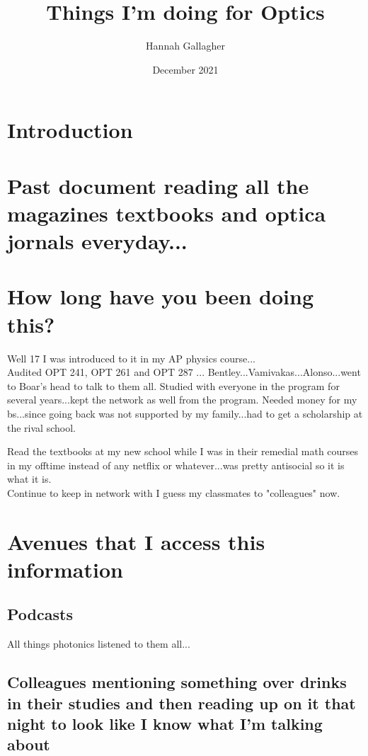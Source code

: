 \documentclass{article}
\title{Things I'm doing for Optics}
\author{Hannah Gallagher}
\date{December 2021}
\begin{document}
\maketitle

\section{Introduction}



\section{Past document reading all the magazines textbooks and optica jornals everyday...}

\section{How long have you been doing this?}

Well 17 I was introduced to it in my AP physics course... \\ 
Audited OPT 241, OPT 261 and OPT 287 ... Bentley...Vamivakas...Alonso...went to Boar's head to talk to them all. Studied with everyone in the program for several years...kept the network as well from the program. Needed money for my bs...since going back was not supported by my family...had to get a scholarship at the rival school. 

Read the textbooks at my new school while I was in their remedial math courses in my offtime instead of any netflix or whatever...was pretty antisocial so it is what it is. \\ 

Continue to keep in network with I guess my classmates to "colleagues" now. \\


\section{Avenues that I access this information}

\subsection{Podcasts}

All things photonics listened to them all...


\subsection{Colleagues mentioning something over drinks in their studies and then reading up on it that night to look like I know what I'm talking about}
\end{document}
